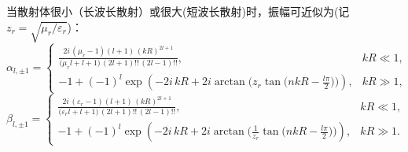 \begin{example}
	当散射体很小（长波长散射）或很大(短波长散射)时，振幅可近似为(记\(z_r=\sqrt{\mu_r/\varepsilon_r}\))：
	\begin{equation*}
		\alpha_{l,\pm1}=
		\begin{cases}
			\displaystyle
			\frac{2 i \,(\mu_r-1)(l+1)\,(kR)^{2l+1}}
			{\big(\mu_r l+l+1\big)\,(2l+1)!!\,(2l-1)!!},
			 & kR\ll 1, \\[6pt]
			\displaystyle
			 -1+(-1)^l\exp\!\left(-2 i\,kR+2i\arctan\!\Big(z_r\tan\!\big(nkR-\frac{l\pi}{2}\big)\Big)\right),
			 & kR\gg 1,
		\end{cases}
	\end{equation*}
	\begin{equation*}
		\beta_{l,\pm1}=
		\begin{cases}
			\displaystyle
			\frac{2 i \,(\varepsilon_r-1)(l+1)\,(kR)^{2l+1}}
			{\big(\varepsilon_r l+l+1\big)\,(2l+1)!!\,(2l-1)!!},
			 & kR\ll 1, \\[6pt]
			\displaystyle
			 -1+(-1)^l\exp\!\left(-2 i\,kR+2i\arctan\!\Big(\frac{1}{z_r}\tan\!\big(nkR-\frac{l\pi}{2}\big)\Big)\right),
			 & kR\gg 1.
		\end{cases}
	\end{equation*}
\end{example}

